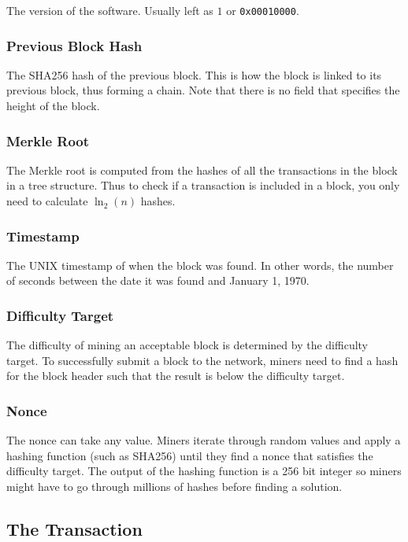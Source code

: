 The version of the software. Usually left as $1$ or \texttt{0x00010000}.

\subsubsection{Previous Block Hash}

The SHA256 hash of the previous block. This is how the block is linked to its previous block, thus forming a chain. Note that there is no field that specifies the height of the block.

\subsubsection{Merkle Root}

The Merkle root is computed from the hashes of all the transactions in the block in a tree structure. Thus to check if a transaction is included in a block, you only need to calculate $\ln_2(n)$ hashes.

\subsubsection{Timestamp}

The UNIX timestamp of when the block was found. In other words, the number of seconds between the date it was found and January 1, 1970.

\subsubsection{Difficulty Target}

The difficulty of mining an acceptable block is determined by the difficulty target. To successfully submit a block to the network, miners need to find a hash for the block header such that the result is below the difficulty target.

\subsubsection{Nonce}

The nonce can take any value. Miners iterate through random values and apply a hashing function (such as SHA256) until they find a nonce that satisfies the difficulty target. The output of the hashing function is a 256 bit integer so miners might have to go through millions of hashes before finding a solution.

\subsection{The Transaction}

